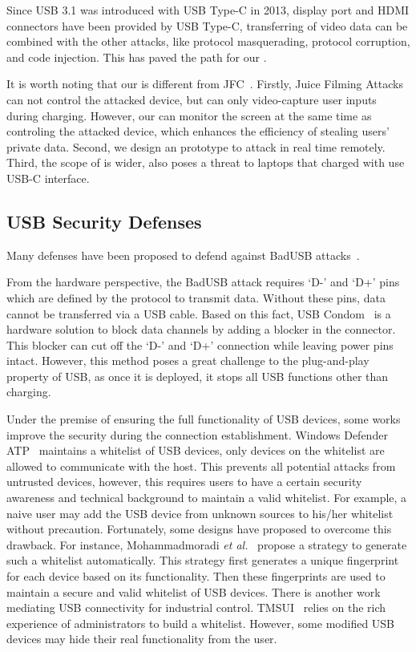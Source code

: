 Since USB 3.1 was introduced with USB Type-C in 2013, display port and HDMI
connectors have been provided by USB Type-C, transferring of video data can be
combined with the other attacks, like protocol masquerading,  protocol
corruption, and code injection. This has paved the path for our \tool.

It is worth noting that our \tool is different from JFC~\cite{JFC}. Firstly, Juice Filming Attacks can not control the attacked device, but can only video-capture user inputs during charging. However, our \tool can monitor the screen at the same time as controling the attacked device, which enhances the efficiency of stealing users’ private data. Second, we design an prototype to attack in real time remotely. Third, the scope of \tool is wider, \tool also poses a threat to laptops that charged with use USB-C interface.

\subsection{USB Security Defenses}
\label{subsec:usb_defence}

Many defenses have been proposed to defend against BadUSB attacks~\cite{sok}.

From the hardware perspective, the BadUSB attack requires `D-' and `D+' pins which
are defined by the protocol to transmit data. Without these pins, data cannot 
be transferred via a USB cable. Based
on this fact, USB Condom~\cite{Condom} is a hardware solution to block data
channels by adding a blocker in the connector. This blocker can cut off the `D-'
and `D+' connection while leaving power pins intact. However, this method poses
a great challenge to the plug-and-play property of USB, as once it is deployed, it
stops all USB functions other than charging.

Under the premise of ensuring the full functionality of USB devices, some works
improve the security during the connection establishment. Windows Defender
ATP~\cite{windenfenderwhite} maintains a whitelist of USB devices, only devices
on the whitelist are allowed to communicate with the host. This prevents all
potential attacks from untrusted devices, however, this requires users to have a
certain security awareness and technical background to maintain a valid
whitelist. For example, a naive user may add the USB device from unknown
sources to his/her whitelist without precaution. Fortunately, some designs have proposed to overcome
this drawback. For instance, Mohammadmoradi \emph{et al.}~\cite{mohammadmoradi2018making} propose a strategy to generate such a
whitelist automatically. This strategy first generates a unique fingerprint for
each device based on its functionality. Then these fingerprints are used to
maintain a secure and valid whitelist of USB devices. There is another work
mediating USB connectivity for industrial control. TMSUI~\cite{yang2015tmsui}
relies on the rich experience of administrators to build a whitelist. However, some
modified USB devices may hide their real functionality from the user.

